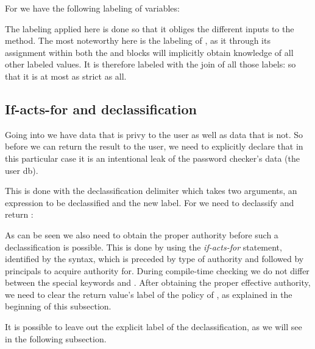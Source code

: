 For  we have the following labeling of variables:\\
\begin{minipage}{\linewidth}

\end{minipage}

The labeling applied here is done so that it obliges the different inputs to the method.
The most noteworthy here is the labeling of , as it through its assignment within both the  and  blocks will implicitly obtain knowledge of all other labeled values.
It is therefore labeled with the join of all those labels:  so that it is at most as strict as all.

\subsection{If-acts-for and declassification}\label{ctif:informal:ifactsfor_declassify}
Going into  we have data that is privy to the user as well as data that is not.
So before we can return the result to the user, we need to explicitly declare that in this particular case it is an intentional leak of the password checker's data (the user db).

This is done with the declassification delimiter \dlmc{<| |>} which takes two arguments, an expression to be declassified and the new label.
For  we need to declassify and return :\\
\begin{minipage}{\linewidth}

\end{minipage}

As can be seen we also need to obtain the proper authority before such a declassification is possible.
This is done by using the \emph{if-acts-for} statement, identified by the  syntax, which is preceded by type of authority and followed by principals to acquire authority for.
During compile-time checking we do not differ between the special keywords  and .
After obtaining the proper effective authority, we need to clear the return value's label of the policy of , as explained in the beginning of this subsection.

It is possible to leave out the explicit label of the declassification, as we will see in the following subsection.

